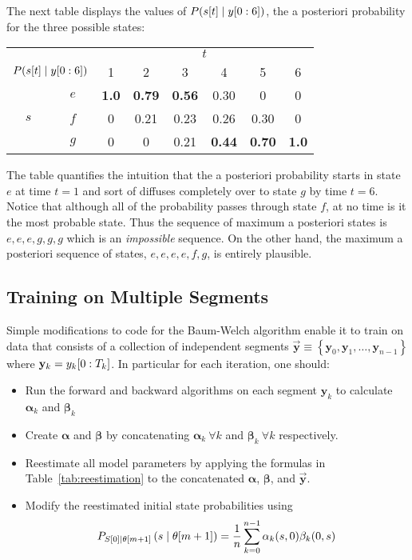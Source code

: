 The next table displays the values of $P({s}{[t]}\mid y[0:6])$, the
a posteriori probability for the three possible states:
\begin{center}
  \begin{tabular}{cc|cccccc}
    &   & \multicolumn{6}{c}{$t$} \\
    \multicolumn{2}{r|}{$P({s}{[t]}\mid y[0:6])$}
        & 1 & 2 & 3 & 4 & 5 & 6 \\
    \hline
    & $e$ & \textbf{1.0} & \textbf{0.79} & \textbf{0.56} & 0.30 & 0    & 0  \\
$s$ & $f$ & 0   & 0.21 & 0.23 & 0.26 & 0.30 & 0   \\
    & $g$ & 0   & 0    & 0.21 & \textbf{0.44} & \textbf{0.70} & \textbf{1.0}
  \end{tabular}
\end{center}
The table quantifies the intuition that the a posteriori probability starts
in state $e$ at time $t=1$ and sort of diffuses completely over to
state $g$ by time $t=6$.  Notice that although all of the probability
passes through state $f$, at no time is it the most probable state.
Thus the sequence of maximum a posteriori states is $e,e,e,g,g,g$ which is
an \emph{impossible} sequence.  On the other hand, the maximum a posteriori
sequence of states, $e,e,e,e,f,g$, is entirely plausible.

\subsection{Training on Multiple Segments}
\label{sec:MultiSegment}


Simple modifications to code for the Baum-Welch algorithm enable it to
train on data that consists of a collection of independent segments
$\mathbf{\vec y} \equiv \left\{ \mathbf{y}_0, \mathbf{y}_1, \ldots,
  \mathbf{y}_{n-1} \right\}$ where $ \mathbf{y}_k = y_k[0:T_k]$.
In particular for each iteration, one should:
\begin{itemize}
\item Run the forward and backward algorithms on each segment
  $\mathbf{y}_k$ to calculate ${\bm \alpha}_k$ and
  ${\bm \beta}_k$
\item Create ${\bm \alpha}$ and ${\bm \beta}$ by concatenating
  ${\bm \alpha}_k~\forall k$ and ${\bm \beta}_k~\forall k$
  respectively.
\item Reestimate all model parameters by applying the formulas in
  Table~\ref{tab:reestimation} to the concatenated  ${\bm \alpha}$,
  ${\bm \beta}$, and $\mathbf{\vec y}$.
\item Modify the reestimated initial state probabilities using
  \begin{equation*}
    P_{{S}{[0]}\mid {\theta}{[m+1]}} \left(s\mid {\theta}{[m+1]}
    \right) = \frac{1}{n} \sum_{k=0}^{n-1} \alpha_k(s,0) \beta_k(0,s)
  \end{equation*}
\end{itemize}

